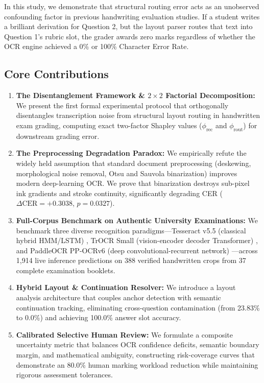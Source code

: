 \documentclass[journal]{IEEEtran}
\begin{document}
In this study, we demonstrate that structural routing error acts as an unobserved confounding factor in previous handwriting evaluation studies. If a student writes a brilliant derivation for Question 2, but the layout parser routes that text into Question 1's rubric slot, the grader awards zero marks regardless of whether the OCR engine achieved a 0\% or 100\% Character Error Rate.

\subsection{Core Contributions}
\begin{enumerate}
    \item \textbf{The Disentanglement Framework \& $2\times 2$ Factorial Decomposition:} We present the first formal experimental protocol that orthogonally disentangles transcription noise from structural layout routing in handwritten exam grading, computing exact two-factor Shapley values ($\phi_{\text{rec}}$ and $\phi_{\text{rout}}$) for downstream grading error.
    \item \textbf{The Preprocessing Degradation Paradox:} We empirically refute the widely held assumption that standard document preprocessing (deskewing, morphological noise removal, Otsu and Sauvola binarization) improves modern deep-learning OCR. We prove that binarization destroys sub-pixel ink gradients and stroke continuity, significantly degrading CER ($\Delta\text{CER} = +0.3038$, $p = 0.0327$).
    \item \textbf{Full-Corpus Benchmark on Authentic University Examinations:} We benchmark three diverse recognition paradigms---Tesseract v5.5 (classical hybrid HMM/LSTM) \cite{smith2007tesseract}, TrOCR Small (vision-encoder decoder Transformer) \cite{li2023trocr}, and PaddleOCR PP-OCRv6 (deep convolutional-recurrent network) \cite{du2020ppocr}---across 1,914 live inference predictions on 388 verified handwritten crops from 37 complete examination booklets.
    \item \textbf{Hybrid Layout \& Continuation Resolver:} We introduce a layout analysis architecture that couples anchor detection with semantic continuation tracking, eliminating cross-question contamination (from 23.83\% to 0.0\%) and achieving 100.0\% answer slot accuracy.
    \item \textbf{Calibrated Selective Human Review:} We formulate a composite uncertainty metric that balances OCR confidence deficits, semantic boundary margin, and mathematical ambiguity, constructing risk-coverage curves that demonstrate an 80.0\% human marking workload reduction while maintaining rigorous assessment tolerances.
\end{enumerate}
\end{document}
